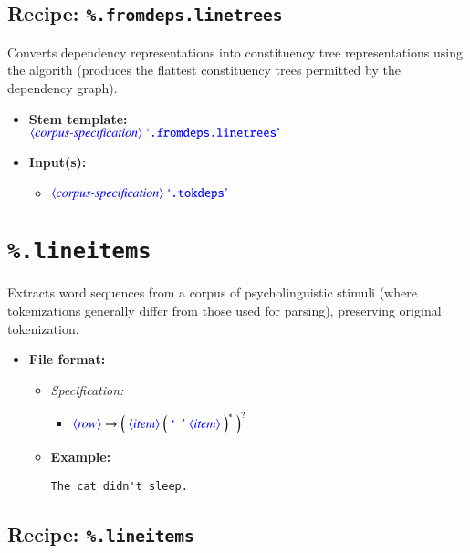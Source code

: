 \documentclass[12pt]{report}
\def\blue{\color{blue}}
\def\magenta{\color{magenta}}
\begin{document}
\subsection{Recipe: {\blue\tt \%.fromdeps.linetrees}}

Converts dependency representations into constituency tree representations using the \cite{collinsetal99} algorith (produces the flattest constituency trees permitted by the dependency graph).

\begin{itemize}
      \item \textbf{Stem template:}\\
      $\dtype{corpus-specification} \ \dcode{.fromdeps.linetrees}$
      \item \textbf{Input(s):}
      \begin{itemize}
            \item $\dtype{corpus-specification} \ \dcode{.tokdeps}$
      \end{itemize}
\end{itemize}


\section{\blue\tt \%.lineitems}

Extracts word sequences from a corpus of psycholinguistic stimuli (where tokenizations generally differ from those used for parsing), preserving original tokenization.

\begin{itemize}
\item\textbf{File format:}
\begin{itemize}
\item\textit{Specification:}

\begin{itemize}
\item $\dtype{row} \rightarrow \Big( \ \dtype{item} \ \Big( \ \dcode{\ } \ \dtype{item} \ \Big)^* \ \Big)^?$
\end{itemize}

\item\textbf{Example:}

{\magenta\begin{verbatim}
The cat didn't sleep.
\end{verbatim}
}
\end{itemize}
\end{itemize}

\subsection{Recipe: {\blue\tt \%.lineitems}}
\end{document}

